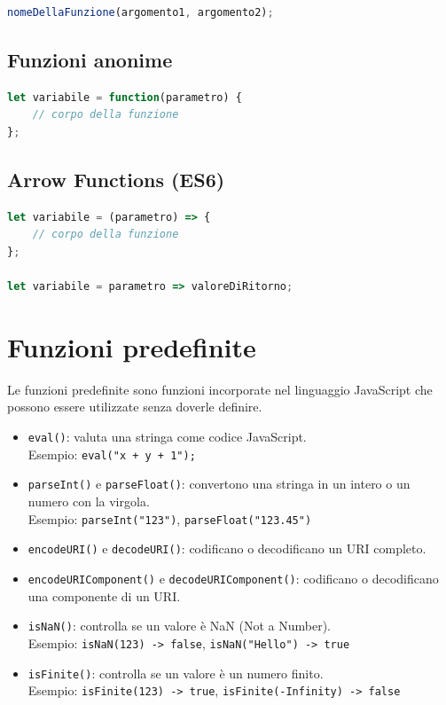 \begin{lstlisting}[language=JavaScript]
nomeDellaFunzione(argomento1, argomento2);
\end{lstlisting}

\subsection{Funzioni anonime}

\begin{lstlisting}[language=JavaScript]
let variabile = function(parametro) {
    // corpo della funzione
};
\end{lstlisting}

\subsection{Arrow Functions (ES6)}

\begin{lstlisting}[language=JavaScript]
let variabile = (parametro) => {
    // corpo della funzione
};

let variabile = parametro => valoreDiRitorno;
\end{lstlisting}

\section{Funzioni predefinite}

Le funzioni predefinite sono funzioni incorporate nel linguaggio JavaScript che possono essere utilizzate senza doverle definire.

\begin{itemize}
    \item \texttt{eval()}: valuta una stringa come codice JavaScript.\\
        Esempio: \texttt{eval("x + y + 1");}
    \item \texttt{parseInt()} e \texttt{parseFloat()}: convertono una stringa in un intero o un numero con la virgola.\\
        Esempio: \texttt{parseInt("123")}, \texttt{parseFloat("123.45")}
    \item \texttt{encodeURI()} e \texttt{decodeURI()}: codificano o decodificano un URI completo.
    \item \texttt{encodeURIComponent()} e \texttt{decodeURIComponent()}: codificano o decodificano una componente di un URI.
    \item \texttt{isNaN()}: controlla se un valore è NaN (Not a Number).\\
        Esempio: \texttt{isNaN(123) -> false}, \texttt{isNaN("Hello") -> true}
    \item \texttt{isFinite()}: controlla se un valore è un numero finito.\\
        Esempio: \texttt{isFinite(123) -> true}, \texttt{isFinite(-Infinity) -> false}
\end{itemize}

